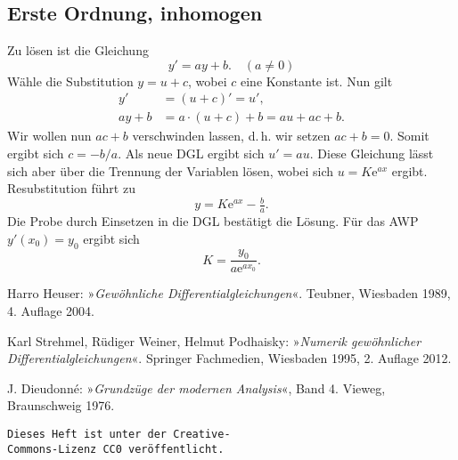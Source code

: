 \documentclass[a4paper,10pt,fleqn,twocolumn,twoside,openany]{article}
\numberwithin{equation}{section}
\newcommand{\ee}{\mathrm e}
\theoremstyle{definition}
\begin{document}
\subsection{Erste Ordnung, inhomogen}
Zu lösen ist die Gleichung
\begin{equation}
y' = ay+b.\quad (a\ne 0)
\end{equation}
Wähle die Substitution $y=u+c$, wobei
$c$ eine Konstante ist. Nun gilt
\begin{align}
y' &= (u+c)' = u',\\
ay+b &= a\cdot (u+c)+b = au+ac+b.
\end{align}
Wir wollen nun $ac+b$ verschwinden lassen, d.\,h. wir setzen
$ac+b=0$. Somit ergibt sich $c=-b/a$. Als neue DGL ergibt sich
$u' = au$. Diese Gleichung lässt sich aber über die Trennung
der Variablen lösen, wobei sich $u=K\ee^{ax}$ ergibt. Resubstitution
führt zu
\begin{equation}
y = K\ee^{ax}-\tfrac{b}{a}.
\end{equation}
Die Probe durch Einsetzen in die DGL bestätigt die Lösung.
Für das AWP $y'(x_0)=y_0$ ergibt sich
\begin{equation}
K = \frac{y_0}{a\ee^{ax_0}}.
\end{equation}

\begin{thebibliography}{x}
 Harro Heuser: »\emph{Gewöhnliche
Differentialgleichungen}«. Teubner, Wiesbaden 1989, 4. Auflage 2004.

 Karl Strehmel, Rüdiger Weiner, Helmut Podhaisky:
»\emph{Numerik gewöhnlicher Differentialgleichungen}«. Springer
Fachmedien, Wiesbaden 1995, 2. Auflage 2012.

 J. Dieudonné:
»\emph{Grundzüge der modernen Analysis}«, Band 4.
Vieweg, Braunschweig 1976.
\end{thebibliography}

\vfill
\noindent
\texttt{Dieses Heft ist unter der Creative-\\
Commons-Lizenz CC0 veröffentlicht.}
\end{document}
